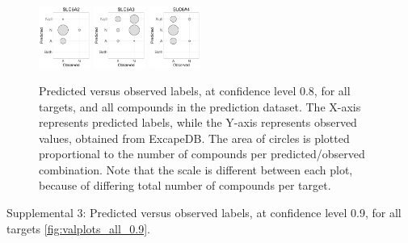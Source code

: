 \documentclass[utf8]{frontiersSCNS} %
\begin{document}
\begin{figure}[h!]
\includegraphics[width=0.15\textwidth]{figures/validation_plots/slc6a2_0p8_valplot.pdf}
\includegraphics[width=0.15\textwidth]{figures/validation_plots/slc6a3_0p8_valplot.pdf}
\vspace*{10pt} %
\includegraphics[width=0.15\textwidth]{figures/validation_plots/slc6a4_0p8_valplot.pdf}

    \caption{Predicted versus observed labels, at confidence level 0.8,
    for all targets, and all compounds in the prediction dataset.
    The X-axis represents predicted labels, while the Y-axis represents observed values,
    obtained from ExcapeDB. The area of circles is plotted proportional to the number of
    compounds per predicted/observed combination. Note that the scale is different between
    each plot, because of differing total number of compounds per target.
    }
    \label{fig:valplots_all_0.8}
\end{figure}

Supplemental 3: Predicted versus observed labels, at confidence level 0.9,
    for all targets \ref{fig:valplots_all_0.9}.
\end{document}

